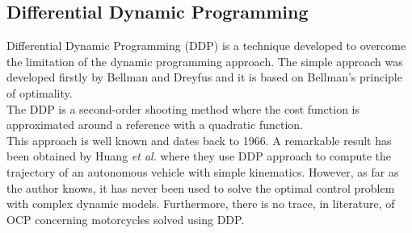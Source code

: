 \subsection{Differential Dynamic Programming}
%
Differential Dynamic Programming (DDP) is a technique developed to overcome the limitation of the dynamic programming approach. The simple approach was developed firstly by Bellman and Dreyfus and it is based on Bellman's principle of optimality.\cite{bellman2015applied}\\
The DDP is a second-order shooting method where the cost function is approximated around a reference with a quadratic function.\cite{mayne1966second}\\ 
This approach is well known and dates back to 1966. A remarkable result has been obtained by Huang \textit{et al.}\cite{huang2014trajectory} where they use DDP approach to compute the trajectory of an autonomous vehicle with simple kinematics. However, as far as the author knows, it has never been used to solve the optimal control problem with complex dynamic models. Furthermore, there is no trace, in literature, of OCP concerning motorcycles solved using DDP.
%